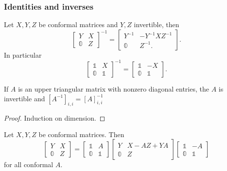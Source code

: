 \subsubsection{Identities and inverses}
\begin{lemma}
Let $X,Y,Z$ be conformal matrices and $Y,Z$ invertible, then
\[ \begin{bmatrix}
Y & X \\ \mathbb{0} & Z
\end{bmatrix}^{-1} = \begin{bmatrix}
Y^{-1} & -Y^{-1}XZ^{-1} \\ \mathbb{0} & Z^{-1}.
\end{bmatrix}. \]
In particular
\[ \begin{bmatrix}
\mathbb{1} & X \\ \mathbb{0} & \mathbb{1}
\end{bmatrix}^{-1} = \begin{bmatrix}
\mathbb{1} & -X \\ \mathbb{0} & \mathbb{1}
\end{bmatrix}. \]
\end{lemma}
\begin{corollary}
If $A$ is an upper triangular matrix with nonzero diagonal entries, the $A$ is invertible and $[A^{-1}]_{i,i} = [A]_{i,i}^{-1}$
\end{corollary}
\begin{proof}
Induction on dimension.
\end{proof}

\begin{lemma}
Let $X,Y,Z$ be conformal matrices. Then
\[ \begin{bmatrix}
Y & X \\ \mathbb{0} & Z
\end{bmatrix} = \begin{bmatrix}
\mathbb{1} & A \\ \mathbb{0} & \mathbb{1}
\end{bmatrix}\begin{bmatrix}
Y & X-AZ + YA \\ \mathbb{0} & Z
\end{bmatrix}\begin{bmatrix}
\mathbb{1} & -A \\ \mathbb{0} & \mathbb{1}
\end{bmatrix} \]
for all conformal $A$.
\end{lemma}

